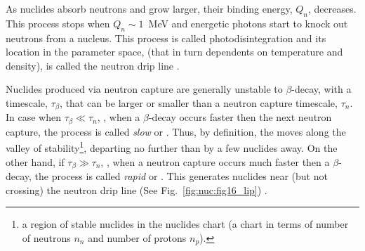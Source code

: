 %
%
%
As nuclides absorb neutrons and grow larger, their binding energy, $Q_n$, decreases. 
This process stops when $Q_n\sim1$~MeV and energetic photons start to knock out 
neutrons from a nucleus. This process is called photodisintegration and its location 
in the parameter space, (that in turn dependents on temperature and density), is called 
the 
neutron drip line 
\citep{Rolfs:1988}.

Nuclides produced via neutron capture are generally unstable to $\beta$-decay, with a timescale, 
$\tau_{\beta}$, that can be larger or smaller than a neutron capture timescale, $\tau_n$. 
In case when $\tau_{\beta}\ll\tau_n$, \ie, when a $\beta$-decay occurs faster then the next 
neutron capture, the process is called \textit{slow} or \sproc{}. 
Thus, by definition, the \sproc{} moves along the valley of stability\footnote{
    a region of stable nuclides in the nuclides chart (a chart in terms of 
    number of neutrons $n_n$ 
    and number of protons $n_p$).
}, departing no further than by a few nuclides away.
On the other hand, if $\tau_{\beta}\gg\tau_n$, \ie, when a neutron capture occurs much 
faster then a $\beta$-decay, the process is called \textit{rapid} or \rproc{}. This \nuc{} 
generates nuclides near (but not crossing) the neutron drip line 
(See Fig.~\ref{fig:nuc:fig16_lip}) \citep{Rolfs:1988}. 


